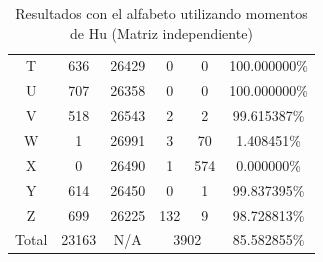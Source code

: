 \documentclass[a4paper, 11pt, oneside]{report}
\begin{document}
\begin{table}
\begin{tabular}{|c|c|c|c|c|c|}
T & 636 & 26429 & 0 & 0 & 100.000000\% \\ 
U & 707 & 26358 & 0 & 0 & 100.000000\% \\ 
V & 518 & 26543 & 2 & 2 & 99.615387\% \\ 
W & 1 & 26991 & 3 & 70 & 1.408451\% \\ 
X & 0 & 26490 & 1 & 574 & 0.000000\% \\ 
Y & 614 & 26450 & 0 & 1 & 99.837395\% \\ 
Z & 699 & 26225 & 132 & 9 & 98.728813\% \\ 
\hline
Total & 23163 & N/A & \multicolumn{2}{|c|}{3902} & 85.582855\% \\
\hline
\end{tabular}
\caption{Resultados con el alfabeto utilizando momentos de Hu (Matriz independiente)}
\label{tb:alphaHuIndep}
\end{table}
\end{document}
